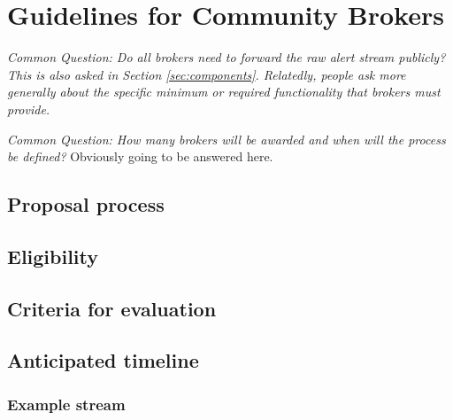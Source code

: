 \section{Guidelines for Community Brokers}\label{sec:community_brokers}

{\it Common Question: Do all brokers need to forward the raw alert stream publicly? This is also asked in Section \ref{sec:components}. Relatedly, people ask more generally about the specific minimum or required functionality that brokers must provide.}

{\it Common Question: How many brokers will be awarded and when will the process be defined?} Obviously going to be answered here.


\subsection{Proposal process}

\subsection{Eligibility}

\subsection{Criteria for evaluation}

\subsection{Anticipated timeline}

\subsubsection{Example stream}
